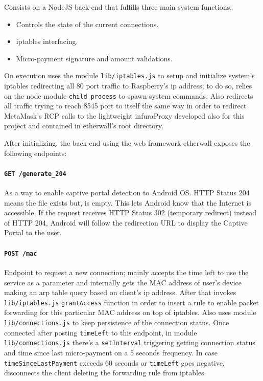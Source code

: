 \documentclass[12pt]{amsart}
\begin{document}
\begin{multicols}{2}
\vspace{0.35cm}

Consists on a NodeJS back-end that fulfills three main system functions:

\begin{itemize}
\item Controls the state of the current connections.
\item iptables interfacing.
\item Micro-payment signature and amount validations.
\end{itemize}

On execution uses the module \texttt{lib/iptables.js}
to setup and initialize system's iptables redirecting
all 80 port traffic to Raspberry's
ip address; to do so, relies on the node module \texttt{child\_process}
to spawn system commands. Also redirects all traffic trying
to reach 8545 port to itself the same way in order to
redirect MetaMask's RCP calls to the lightweight infuraProxy\cite{infuraProxy}
developed also for this project and contained in etherwall's root directory.

\vspace{0.35cm}

After initializing, the back-end using the web framework\cite{express}
etherwall exposes the following endpoints:

\vspace{0.35cm}

\paragraph{\texttt{GET /generate\_204}} As a way to enable
captive portal detection to Android OS. HTTP Status 204
means the file exists but, is empty.
This lets Android know that the Internet is accessible.
If the request receives HTTP Status 302 (temporary redirect)
instead of HTTP 204, Android will follow the
redirection URL to display the Captive Portal to the user.

\vspace{0.35cm}

\paragraph{\texttt{POST /mac}} Endpoint to request a new
connection; mainly
accepts the time left to use the service as a parameter
and internally gets the MAC address of user's device
making an arp table query based on client's ip address.
After that invokes \texttt{lib/iptables.js} \texttt{grantAccess}
function in order to insert a rule to enable packet forwarding
for this particular MAC address on top of iptables.
Also uses module \texttt{lib/connections.js} to keep persistence
of the connection status. Once connected after posting
\texttt{timeLeft} to this endpoint, in module
\texttt{lib/connections.js} there's a \texttt{setInterval}
triggering getting connection status and time since last
micro-payment on a 5 seconds frequency. In case \texttt{timeSinceLastPayment}
exceeds 60 seconds or \texttt{timeLeft} goes negative,
disconnects the client deleting the forwarding rule from
iptables.


\end{multicols}
\end{document}
